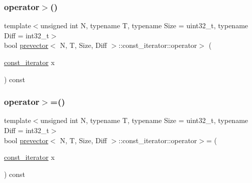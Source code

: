 \subsubsection{\texorpdfstring{operator$>$()}{operator>()}}
{\footnotesize\ttfamily template$<$unsigned int N, typename T, typename Size = uint32\+\_\+t, typename Diff = int32\+\_\+t$>$ \\
bool \mbox{\hyperlink{classprevector}{prevector}}$<$ N, T, Size, Diff $>$\+::const\+\_\+iterator\+::operator$>$ (\begin{DoxyParamCaption}\item[{\mbox{\hyperlink{classprevector_1_1const__iterator}{const\+\_\+iterator}}}]{x }\end{DoxyParamCaption}) const\hspace{0.3cm}{\ttfamily [inline]}}

\mbox{\label{classprevector_1_1const__iterator_a9312691e9a5a8097034ffb23b6b6745c}} 
\subsubsection{\texorpdfstring{operator$>$=()}{operator>=()}}
{\footnotesize\ttfamily template$<$unsigned int N, typename T, typename Size = uint32\+\_\+t, typename Diff = int32\+\_\+t$>$ \\
bool \mbox{\hyperlink{classprevector}{prevector}}$<$ N, T, Size, Diff $>$\+::const\+\_\+iterator\+::operator$>$= (\begin{DoxyParamCaption}\item[{\mbox{\hyperlink{classprevector_1_1const__iterator}{const\+\_\+iterator}}}]{x }\end{DoxyParamCaption}) const\hspace{0.3cm}{\ttfamily [inline]}}

\mbox{\label{classprevector_1_1const__iterator_ac15fe13f4a08c2c76fc1ee45ec73db51}} 
